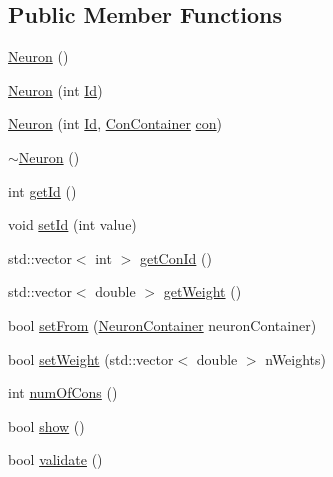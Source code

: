 \subsection*{Public Member Functions}
\begin{DoxyCompactItemize}
\item 
\hyperlink{class_neuron_a823487d01615fadb8ac19a2768dd9d96}{Neuron} ()
\item 
\hyperlink{class_neuron_a05698a11ac18b6cee34d18f63681ddcc}{Neuron} (int \hyperlink{class_neuron_a72bb327a7c5c865e6748a4e074ce0680}{Id})
\item 
\hyperlink{class_neuron_acc10f105d08a2303a0282bbafa03b032}{Neuron} (int \hyperlink{class_neuron_a72bb327a7c5c865e6748a4e074ce0680}{Id}, \hyperlink{class_con_container}{ConContainer} \hyperlink{class_neuron_a1e92229eb19c3f322e118bdf23b9844e}{con})
\item 
\hyperlink{class_neuron_a94a250ce7e167760e593979b899745b1}{$\sim$Neuron} ()
\item 
int \hyperlink{class_neuron_ad9211d55ea50ad6dfbd2676b9e2335e4}{getId} ()
\item 
void \hyperlink{class_neuron_aa93290c13b40c5b07d92f272a0a2ce63}{setId} (int value)
\item 
std::vector$<$ int $>$ \hyperlink{class_neuron_aac7d538b4a5087f730ba80f19852bced}{getConId} ()
\item 
std::vector$<$ double $>$ \hyperlink{class_neuron_a3349c0a2053e35afa5b7036bb816f8c6}{getWeight} ()
\item 
bool \hyperlink{class_neuron_ac8129f5de3ec1c143f40d507b6843649}{setFrom} (\hyperlink{class_neuron_container}{NeuronContainer} neuronContainer)
\item 
bool \hyperlink{class_neuron_a93b27c179c576758ff437b9273b95041}{setWeight} (std::vector$<$ double $>$ nWeights)
\item 
int \hyperlink{class_neuron_ae447dce39ed04581609a83d742b585d1}{numOfCons} ()
\item 
bool \hyperlink{class_neuron_a255c3597520c730d798218f7174eff1b}{show} ()
\item 
bool \hyperlink{class_neuron_a95327aa80a9ec949491f214a0c159b5a}{validate} ()
\end{DoxyCompactItemize}
